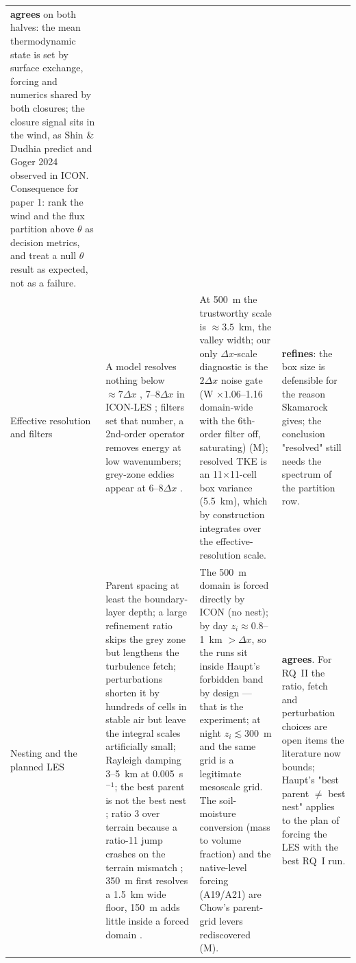 \documentclass[10pt,a4paper]{article}
\newcommand{\dx}{\Delta x}
\newcommand{\agree}{\textcolor{green!45!black}{\textbf{agrees}}}
\newcommand{\refines}{\textcolor{blue!60!black}{\textbf{refines}}}
\begin{document}
\begin{landscape}
\begin{xltabular}{\linewidth}{@{}>{\raggedright\arraybackslash}p{2.2cm}
  >{\raggedright\arraybackslash}X >{\raggedright\arraybackslash}X >{\raggedright\arraybackslash}p{5.0cm}@{}}
\agree{} on both halves: the mean thermodynamic state is set by surface exchange, forcing and numerics shared by both closures; the closure signal sits in the wind, as Shin \& Dudhia predict and Goger 2024 observed in ICON. Consequence for paper 1: rank the wind and the flux partition above $\theta$ as decision metrics, and treat a null $\theta$ result as expected, not as a failure. \\
\addlinespace[3pt]
Effective resolution and filters &
A model resolves nothing below $\approx 7\dx$ \parencite{skamarock2004}, 7--8$\dx$ in ICON-LES \parencite{heinze2017}; filters set that number, a 2nd-order operator removes energy at low wavenumbers; grey-zone eddies appear at 6--8$\dx$ \parencite{zhou2014}. &
At 500~m the trustworthy scale is $\approx 3.5$~km, the valley width; our only $\dx$-scale diagnostic is the $2\dx$ noise gate (W $\times 1.06$--1.16 domain-wide with the 6th-order filter off, saturating) (M); resolved TKE is an 11$\times$11-cell box variance (5.5~km), which by construction integrates over the effective-resolution scale. &
\refines{}: the box size is defensible for the reason Skamarock gives; the conclusion "resolved" still needs the spectrum of the partition row. \\
\addlinespace[3pt]
Nesting and the planned LES &
Parent spacing at least the boundary-layer depth; a large refinement ratio skips the grey zone but lengthens the turbulence fetch; perturbations shorten it by hundreds of cells in stable air but leave the integral scales artificially small; Rayleigh damping 3--5~km at 0.005~s$^{-1}$; the best parent is not the best nest \parencite{haupt2023}; ratio 3 over terrain because a ratio-11 jump crashes on the terrain mismatch \parencite{liu2020}; 350~m first resolves a 1.5~km wide floor, 150~m adds little inside a forced domain \parencite{chow2006}. &
The 500~m domain is forced directly by ICON (no nest); by day $z_i \approx 0.8$--1~km $> \dx$, so the runs sit inside Haupt's forbidden band by design --- that is the experiment; at night $z_i \lesssim 300$~m and the same grid is a legitimate mesoscale grid. The soil-moisture conversion (mass to volume fraction) and the native-level forcing (A19/A21) are Chow's parent-grid levers rediscovered (M). &
\agree{}. For RQ~II the ratio, fetch and perturbation choices are open items the literature now bounds; Haupt's "best parent $\ne$ best nest" applies to the plan of forcing the LES with the best RQ~I run. \\
\end{xltabular}
\end{landscape}
\end{document}
